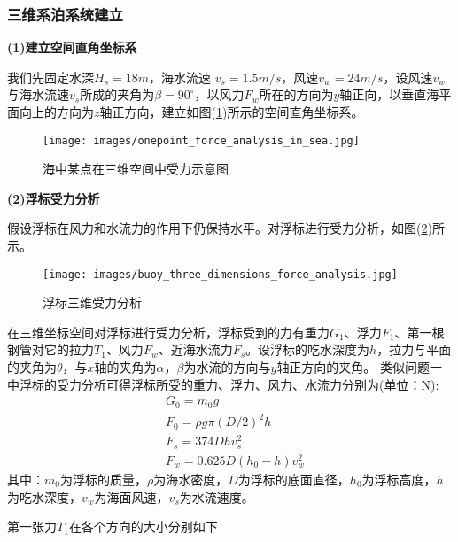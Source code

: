         \subsubsection{三维系泊系统建立}
            \par
            \textbf{(1)建立空间直角坐标系}
            \par
            我们先固定水深$H_s=18m$，海水流速 $v_s=1.5m/s$，风速$v_w =24m/s$，设风速$v_w$与海水流速$v_s$所成的夹角为$\beta=90^\circ$，以风力$F_w$所在的方向为$y$轴正向，以垂直海平面向上的方向为$z$轴正方向，建立如图(\ref{海中某点在三维空间中受力示意图})所示的空间直角坐标系。
            \begin{figure}[H]
            \centering
            \texttt{[image: images/onepoint\_force\_analysis\_in\_sea.jpg]}
            \caption{海中某点在三维空间中受力示意图}
            \label{海中某点在三维空间中受力示意图}
            \end{figure}
            \par
            \textbf{(2)浮标受力分析}
            \par
            假设浮标在风力和水流力的作用下仍保持水平。对浮标进行受力分析，如图(\ref{浮标三维受力分析})所示。
            \begin{figure}[H]
            \centering
            \texttt{[image: images/buoy\_three\_dimensions\_force\_analysis.jpg]}
            \caption{浮标三维受力分析}
            \label{浮标三维受力分析}
            \end{figure}
            \par
            在三维坐标空间对浮标进行受力分析，浮标受到的力有重力$G_1$、浮力$F_1$、第一根钢管对它的拉力$T_1$、风力$F_w$、近海水流力$F_s$。设浮标的吃水深度为$h$，拉力与平面的夹角为$\theta$，与$x$轴的夹角为$\alpha$，$\beta$为水流的方向与$y$轴正方向的夹角。
            类似问题一中浮标的受力分析可得浮标所受的重力、浮力、风力、水流力分别为(单位：N):
            \begin{align*}
            & G_0 = m_0g\\
            & F_0 = \rho g\pi ( D/2 )^2h\\
            & F_s = 374Dhv_s^2\\
            & F_w = 0.625D(h_0-h)v_w^2
            \end{align*}
            其中：$m_0$为浮标的质量，$\rho$为海水密度，$D$为浮标的底面直径，$h_0$为浮标高度，$h$为吃水深度，$v_w$为海面风速，$v_s$为水流速度。
            \par
            第一张力$T_1$在各个方向的大小分别如下
